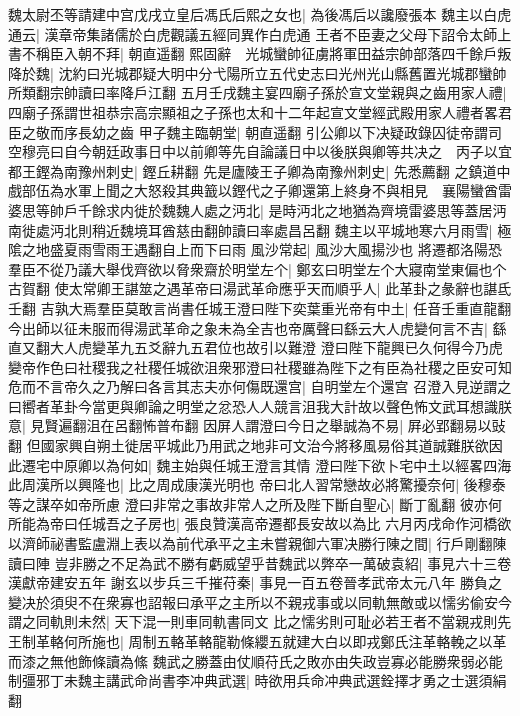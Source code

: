 魏太尉丕等請建中宫戊戌立皇后馮氏后熙之女也|{
	為後馮后以讒廢張本}
魏主以白虎通云|{
	漢章帝集諸儒於白虎觀議五經同異作白虎通}
王者不臣妻之父母下詔令太師上書不稱臣入朝不拜|{
	朝直遥翻}
熙固辭　光城蠻帥征虜將軍田益宗帥部落四千餘戶叛降於魏|{
	沈約曰光城郡疑大明中分弋陽所立五代史志曰光州光山縣舊置光城郡蠻帥所類翻宗帥讀曰率降戶江翻}
五月壬戌魏主宴四廟子孫於宣文堂親與之齒用家人禮|{
	四廟子孫謂世祖恭宗高宗顯祖之子孫也太和十二年起宣文堂經武殿用家人禮者畧君臣之敬而序長幼之齒}
甲子魏主臨朝堂|{
	朝直遥翻}
引公卿以下决疑政錄囚徒帝謂司空穆亮曰自今朝廷政事日中以前卿等先自論議日中以後朕與卿等共决之　丙子以宜都王鏗為南豫州刺史|{
	鏗丘耕翻}
先是廬陵王子卿為南豫州刺史|{
	先悉薦翻}
之鎮道中戲部伍為水軍上聞之大怒殺其典籖以鏗代之子卿還第上終身不與相見　襄陽蠻酋雷婆思等帥戶千餘求内徙於魏魏人處之沔北|{
	是時沔北之地猶為齊境雷婆思等蓋居沔南徙處沔北則稍近魏境耳酋慈由翻帥讀曰率處昌呂翻}
魏主以平城地寒六月雨雪|{
	極隂之地盛夏雨雪雨王遇翻自上而下曰雨}
風沙常起|{
	風沙大風揚沙也}
將遷都洛陽恐羣臣不從乃議大舉伐齊欲以脅衆齋於明堂左个|{
	鄭玄曰明堂左个大寢南堂東偏也个古賀翻}
使太常卿王諶筮之遇革帝曰湯武革命應乎天而順乎人|{
	此革卦之彖辭也諶氐壬翻}
吉孰大焉羣臣莫敢言尚書任城王澄曰陛下奕葉重光帝有中土|{
	任音壬重直龍翻}
今出師以征未服而得湯武革命之象未為全吉也帝厲聲曰繇云大人虎變何言不吉|{
	繇直又翻大人虎變革九五爻辭九五君位也故引以難澄}
澄曰陛下龍興已久何得今乃虎變帝作色曰社稷我之社稷任城欲沮衆邪澄曰社稷雖為陛下之有臣為社稷之臣安可知危而不言帝久之乃解曰各言其志夫亦何傷既還宫|{
	自明堂左个還宫}
召澄入見逆謂之曰嚮者革卦今當更與卿論之明堂之忿恐人人競言沮我大計故以聲色怖文武耳想識朕意|{
	見賢遍翻沮在呂翻怖普布翻}
因屏人謂澄曰今日之舉誠為不易|{
	屛必郢翻易以䜴翻}
但國家興自朔土徙居平城此乃用武之地非可文治今將移風易俗其道誠難朕欲因此遷宅中原卿以為何如|{
	魏主始與任城王澄言其情}
澄曰陛下欲卜宅中土以經畧四海此周漢所以興隆也|{
	比之周成康漢光明也}
帝曰北人習常戀故必將驚擾奈何|{
	後穆泰等之謀卒如帝所慮}
澄曰非常之事故非常人之所及陛下斷自聖心|{
	斷丁亂翻}
彼亦何所能為帝曰任城吾之子房也|{
	張良贊漢高帝遷都長安故以為比}
六月丙戌命作河橋欲以濟師祕書監盧淵上表以為前代承平之主未嘗親御六軍决勝行陳之間|{
	行戶剛翻陳讀曰陣}
豈非勝之不足為武不勝有虧威望乎昔魏武以弊卒一萬破袁紹|{
	事見六十三卷漢獻帝建安五年}
謝玄以步兵三千摧苻秦|{
	事見一百五卷晉孝武帝太元八年}
勝負之變决於須臾不在衆寡也詔報曰承平之主所以不親戎事或以同軌無敵或以懦劣偷安今謂之同軌則未然|{
	天下混一則車同軌書同文}
比之懦劣則可耻必若王者不當親戎則先王制革輅何所施也|{
	周制五輅革輅龍勒條纓五就建大白以即戎鄭氏注革輅輓之以革而漆之無他飾條讀為絛}
魏武之勝蓋由仗順苻氏之敗亦由失政豈寡必能勝衆弱必能制彊邪丁未魏主講武命尚書李冲典武選|{
	時欲用兵命冲典武選銓擇才勇之士選須絹翻}
